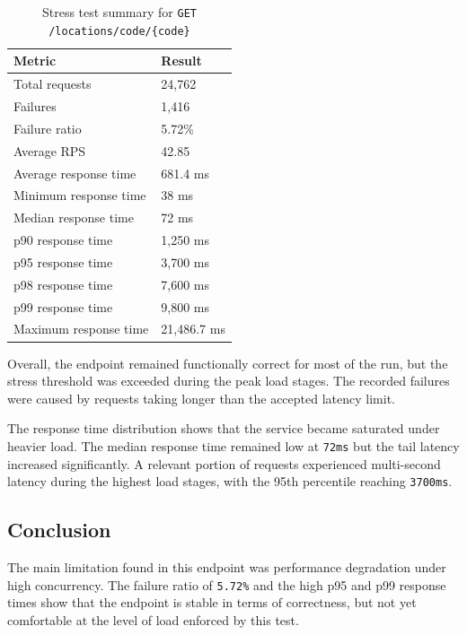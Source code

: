 \begin{table}[H]
    \centering
    \begin{tabular}{ll}
    \hline
    \textbf{Metric} & \textbf{Result} \\\hline
    Total requests & 24,762 \\
    Failures & 1,416 \\
    Failure ratio & 5.72\% \\
    Average RPS & 42.85 \\
    Average response time & 681.4 ms \\
    Minimum response time & 38 ms \\
    Median response time & 72 ms \\
    p90 response time & 1,250 ms \\
    p95 response time & 3,700 ms \\
    p98 response time & 7,600 ms \\
    p99 response time & 9,800 ms \\
    Maximum response time & 21,486.7 ms \\\hline
    \end{tabular}
    \caption{Stress test summary for \texttt{GET /locations/code/\{code\}}}
    \label{tab:stress_locations_code}
\end{table}

Overall, the endpoint remained functionally correct for most of the run, but the stress threshold was exceeded during the peak load stages. The recorded failures were caused by requests taking longer than the accepted latency limit.

The response time distribution shows that the service became saturated under heavier load. The median response time remained low at \texttt{72ms} but the tail latency increased significantly. A relevant portion of requests experienced multi-second latency during the highest load stages, with the 95th percentile reaching \texttt{3700ms}.

\subsection{Conclusion}

The main limitation found in this endpoint was performance degradation under high concurrency. The failure ratio of \texttt{5.72\%} and the high p95 and p99 response times show that the endpoint is stable in terms of correctness, but not yet comfortable at the level of load enforced by this test.



